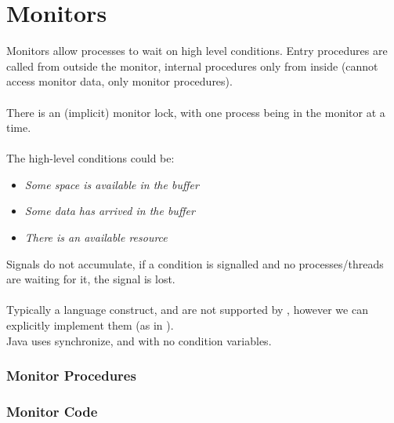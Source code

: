 \documentclass{report}
\begin{document}
    \section*{Monitors}
        Monitors allow processes to wait on high level conditions. Entry procedures are called from outside the monitor, internal procedures only from inside (cannot access monitor data, only monitor procedures).
        \\
        \\ There is an (implicit) monitor lock, with one process being in the monitor at a time.
        \\
        \\ The high-level conditions could be:
        \begin{itemize}
            \item \textit{Some space is available in the buffer}
            \item \textit{Some data has arrived in the buffer}
            \item \textit{There is an available resource}
        \end{itemize}
        Signals do not accumulate, if a condition is signalled and no processes/threads are waiting for it, the signal is lost.
        \\
        \\ Typically a language construct, and are not supported by , however we can explicitly implement them (as in ).
        \\ Java uses synchronize,  and  with no condition variables.
        \subsubsection*{Monitor Procedures}
            \begin{itemize}
            \end{itemize}
        \subsubsection*{Monitor Code}
\end{document}
